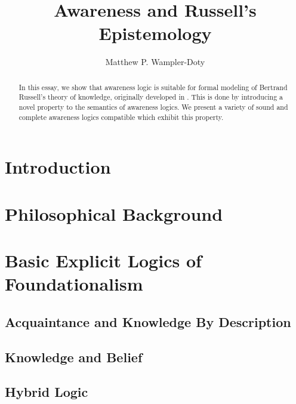\documentclass{article}
\begin{document}
\title{Awareness and Russell's Epistemology}\author{Matthew P.
Wampler-Doty}\date{}\maketitle

\begin{abstract}
  In this essay, we show that awareness logic is suitable for
  formal modeling of Bertrand Russell's theory of knowledge,
  originally developed in \cite{russell_problems_1936}.  This is done
  by introducing a novel property to the semantics of 
  awareness logics. 
  We present a variety of sound and complete awareness
  logics compatible which exhibit this property.
\end{abstract}

\listoftodos

\section{Introduction}
\label{intro}


\section{Philosophical Background}
\label{trad}


\section{Basic Explicit Logics of Foundationalism}

\subsection{Acquaintance and Knowledge By Description}
\label{awarenesslogic0}


\subsection{Knowledge and Belief}
\label{awarenesslogic}


\subsection{Hybrid Logic}
\label{hybrid_awareness}

\end{document}
